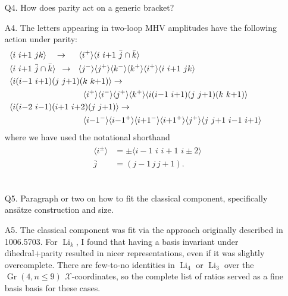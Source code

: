 \documentclass[12pt]{article}
\DeclareMathOperator{\Gr}{Gr}
\DeclareMathOperator{\Li}{Li}
\def\ket#1{\langle #1 \rangle}
\def\x{\mathcal{X}}
\begin{document}
\begin{itemize}
	\item[Q4.] How does parity act on a generic bracket?

	\item[A4.] The letters appearing in two-loop MHV amplitudes have the following action under parity:
	\begin{align}
	\begin{split}
	&\hspace{-1cm}\ket{i\,\,i{+}1\,\,jk}\quad\to\quad\,\,\ket{i^+}\ket{i\,\,i{+}1\,\,\bar{j}\cap\bar{k}}\\
	&\hspace{-1cm}\ket{i\,\,i{+}1\,\,\bar{j}\cap\bar{k}}\,\,\,\to\,\,\,\,\ket{j^{-}}\ket{j^{+}}\ket{k^{-}}\ket{k^{+}}\ket{i^{+}}\ket{i\,\,i{+}1\,\,jk}\\
	&\hspace{-1cm}\ket{i(i{-}1\,\,i{+}1)(j\,\,j{+}1)(k\,\,k{+}1)}\to\\&\qquad\qquad\qquad\ket{i^+}\ket{i^-}\ket{j^+}\ket{k^+}\ket{i(i{-}1\,\,i{+}1)(j\,\,j{+}1)(k\,\,k{+}1)}\\
	&\hspace{-1cm}\ket{i(i{-}2\,\,i{-}1)(i{+}1\,\,i{+}2)(j\,\,j{+}1)}\to\\&\qquad\qquad\qquad\ket{i{-}1^-}\ket{i{-}1^+}\ket{i{+}1^-}\ket{i{+}1^+}\ket{j^+}\ket{j\,\,j{+}1\,\,i{-}1\,\,i{+}1}
	\end{split}
	\end{align}
	where we have used the notational shorthand
	\begin{align}
	\begin{split}
	\ket{i^{\pm}}&=\pm\ket{i-1\,\,i\,\,i+1\,\,i\pm2}\\
	\bar{j}&=(j-1\,j\,j+1).
	\end{split}
	\end{align} \\

	\item[Q5.] Paragraph or two on how to fit the classical component, specifically ansätze construction and size.

	\item[A5.] The classical component was fit via the approach originally described in 1006.5703. For $\Li_k$, I found that having a basis invariant under dihedral+parity resulted in nicer representations, even if it was slightly overcomplete. There are few-to-no identities in $\Li_4$ or $\Li_3$ over the $\Gr(4,n\le9)$ $\x$-coordinates, so the complete list of ratios served as a fine basis basis for these cases. 


\end{itemize}
\end{document}

